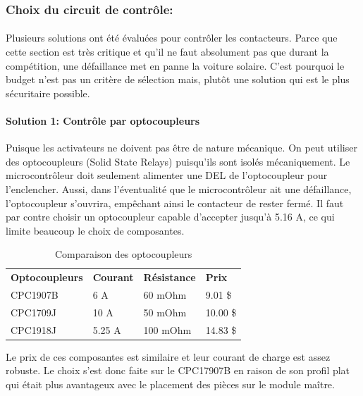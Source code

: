 	\subsubsection*{Choix du circuit de contrôle:}
		\paragraph*{}
		Plusieurs solutions ont été évaluées pour contrôler les contacteurs. Parce que cette section est très critique et qu'il ne faut absolument pas que durant la compétition, une défaillance met en panne la voiture solaire. C'est pourquoi le budget n'est pas un critère de sélection mais, plutôt une solution qui est le plus sécuritaire possible.

		\paragraph*{Solution 1: Contrôle par optocoupleurs}
			
		Puisque les activateurs ne doivent pas être de nature mécanique. On peut utiliser des optocoupleurs (Solid State Relays) puisqu'ils sont isolés mécaniquement. Le microcontrôleur doit seulement alimenter une DEL de l'optocoupleur pour l'enclencher. Aussi, dans l'éventualité que le microcontrôleur ait une défaillance, l'optocoupleur s'ouvrira, empêchant ainsi le contacteur de rester fermé. Il faut par contre choisir un optocoupleur capable d'accepter jusqu'à 5.16 A, ce qui limite beaucoup le choix de composantes.
		
		\begin{table}[H]
			\centering
			\caption{Comparaison des optocoupleurs}
			\label{ComparaisonOpto}
			\begin{tabular}{|p{3cm}|p{3cm}|p{3cm}|p{3cm}|}
				\hline
				\textbf{Optocoupleurs} & \textbf{Courant} & \textbf{Résistance} & \textbf{Prix}
				\\ \hhline{|=|=|=|=|}
				CPC1907B & 6 A & 60 mOhm & 9.01 \$ \\ \hline
				CPC1709J & 10 A & 50 mOhm & 10.00 \$ \\ \hline
				CPC1918J & 5.25 A &	100 mOhm & 14.83 \$	\\ \hline
			\end{tabular}
		\end{table}
		
		Le prix de ces composantes est similaire et leur courant de charge est assez robuste. Le choix s'est donc faite sur le CPC17907B en raison de son profil plat qui était plus avantageux avec le placement des pièces sur le module maître.
		

